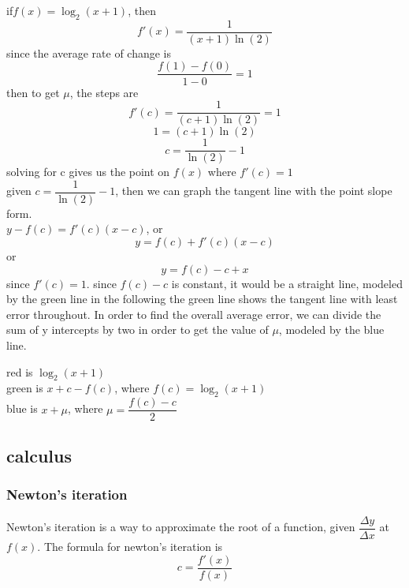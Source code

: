\documentclass{article} %
\begin{document}
        \begin{center}
            if$f(x)=\log_2(x+1)$, then $$f'(x)=\dfrac{1}{(x+1)\ln(2)}$$since the average rate of change is $$\dfrac{f(1)-f(0)}{1-0}=1$$
            then to get $\mu$, the steps are $$f'(c)=\dfrac{1}{(c+1)\ln(2)}=1$$ $$1=(c+1)\ln(2)$$ $$c=\dfrac{1}{\ln(2)}-1$$
            solving for c gives us the point on $f(x)$ where $f'(c)=1$
            \\given $c=\dfrac{1}{\ln(2)}-1$, then we can graph the tangent line with the point slope form.\\ $y-f(c)=f'(c)(x-c)$, or
            $$y=f(c)+f'(c)(x-c)$$ or $$y=f(c)-c+x$$ since $f'(c)=1$. since $f(c)-c$ is constant, it would be a straight line, modeled by the green line in the following
            the green line shows the tangent line with least error throughout. In order to find the overall average error, we can divide the sum of y intercepts by two in order to get the value of $\mu$, modeled by the blue line.
            red is $\log_2(x+1)$\\
            green is $x+c-f(c)$, where $f(c)=\log_2(x+1)$\\
            blue is $x+\mu$, where $\mu=\dfrac{f(c)-c}{2}$
        \end{center}
            \subsection{calculus}
        \subsubsection{Newton's iteration}
            Newton's iteration is a way to approximate the root of a function, given $\dfrac{\Delta y}{\Delta x}$ at $f(x)$. The formula for newton's iteration is $$c=\frac{f'(x)}{f(x)}$$
            \begin{center}
            \end{center}
\end{document}
